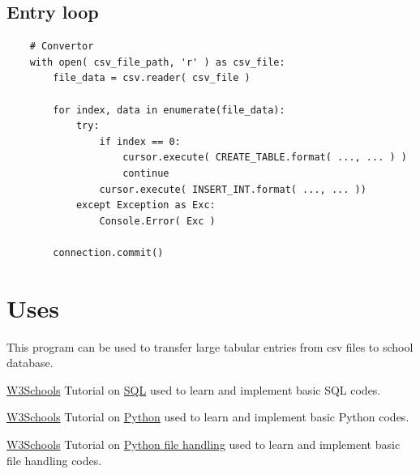 \documentclass[12pt,a4paper]{report}
\begin{document}
        \section{Entry loop}
        \begin{verbatim}
    # Convertor
    with open( csv_file_path, 'r' ) as csv_file:
        file_data = csv.reader( csv_file )
    
        for index, data in enumerate(file_data):
            try:
                if index == 0:
                    cursor.execute( CREATE_TABLE.format( ..., ... ) )
                    continue
                cursor.execute( INSERT_INT.format( ..., ... )) 
            except Exception as Exc:
                Console.Error( Exc )
        
        connection.commit()
        \end{verbatim}
\newpage

    \chapter{Uses}
        \vspace{1cm}
        This program can be used to transfer large tabular entries from csv files to school database.
        
\newpage





    \begin{thebibliography}{10}
		 \href{https://www.w3schools.com/}{W3Schools} Tutorial on \href{https://www.w3schools.com/sql/}{SQL} used to learn and implement basic SQL codes.
        
		 \href{https://www.w3schools.com/}{W3Schools} Tutorial on \href{https://www.w3schools.com/python/}{Python} used to learn and implement basic Python codes.
        
  
		 \href{https://www.w3schools.com/}{W3Schools} Tutorial on \href{https://www.w3schools.com/python/python_file_handling.asp}{Python file handling} used to learn and implement basic file handling codes.
		
    \end{thebibliography}

\end{document}

